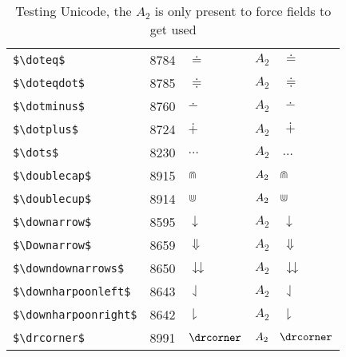 \documentclass{article}
\begin{document}
\begin{table}
\begin{center}
\begin{tabular}{llll}
 \verb#$\doteq$#              & 8784 & $\doteq$              & $A_2\quad \doteq$\\
 \verb#$\doteqdot$#           & 8785 & $\doteqdot$           & $A_2\quad \doteqdot$\\
 \verb#$\dotminus$#           & 8760 & $\dotminus$           & $A_2\quad \dotminus$\\
 \verb#$\dotplus$#            & 8724 & $\dotplus$            & $A_2\quad \dotplus$\\
 \verb#$\dots$#               & 8230 & $\dots$               & $A_2\quad \dots$\\
 \verb#$\doublecap$#          & 8915 & $\doublecap$          & $A_2\quad \doublecap$\\
 \verb#$\doublecup$#          & 8914 & $\doublecup$          & $A_2\quad \doublecup$\\
 \verb#$\downarrow$#          & 8595 & $\downarrow$          & $A_2\quad \downarrow$\\
 \verb#$\Downarrow$#          & 8659 & $\Downarrow$          & $A_2\quad \Downarrow$\\
 \verb#$\downdownarrows$#     & 8650 & $\downdownarrows$     & $A_2\quad \downdownarrows$\\
 \verb#$\downharpoonleft$#    & 8643 & $\downharpoonleft$    & $A_2\quad \downharpoonleft$\\
 \verb#$\downharpoonright$#   & 8642 & $\downharpoonright$   & $A_2\quad \downharpoonright$\\
 \verb#$\drcorner$#           & 8991 & $\drcorner$           & $A_2\quad \drcorner$\\
\end{tabular}
\end{center}
\caption{Testing Unicode, the $A_2$ is only present to force fields to get used}
\end{table}
\end{document}
